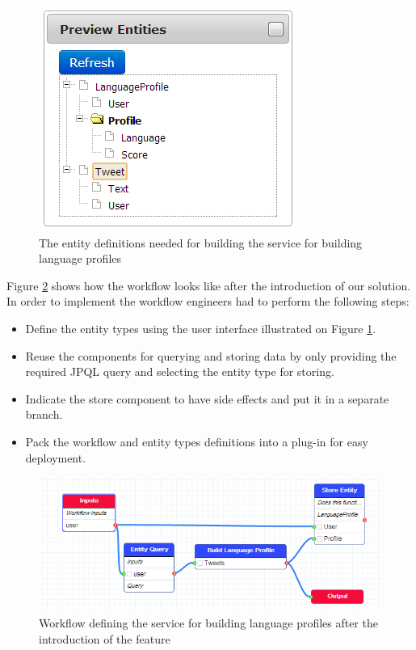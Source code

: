 \begin{figure}[h!]
  \centering
  	\includegraphics[scale=0.65]{storage/eval/entities.png}
  \caption{The entity definitions needed for building the service for building language profiles}
  \label{fig:storageEvalEntities}
\end{figure}

Figure \ref{fig:storageEvalAfter} shows how the workflow looks like after the introduction of our solution. In order to implement the workflow engineers had to perform the following steps:
\begin{itemize}
	\item Define the entity types using the user interface illustrated on Figure \ref{fig:storageEvalEntities}.
	\item Reuse the components for querying and storing data by only providing the required JPQL query and selecting the entity type for storing.
	\item Indicate the store component to have side effects and put it in a separate branch.
	\item Pack the workflow and entity types definitions into a plug-in for easy deployment.
\end{itemize}

\begin{figure}[h!]
  \centering
  	\includegraphics[scale=0.65]{storage/eval/after.png}
  \caption{Workflow defining the service for building language profiles after the introduction of the feature}
  \label{fig:storageEvalAfter}
\end{figure}

